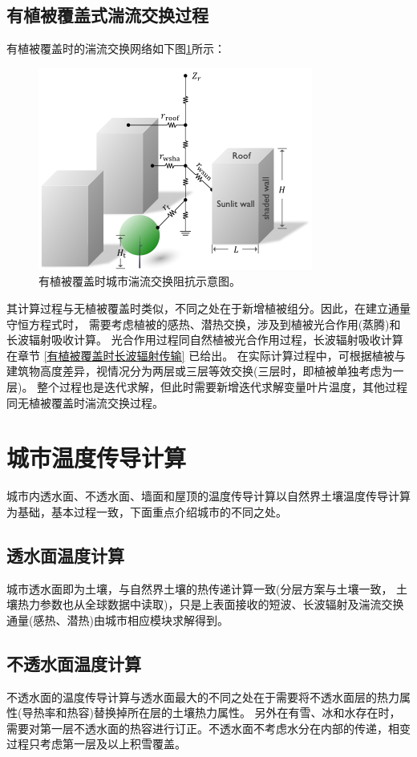 \subsection{有植被覆盖式湍流交换过程}
有植被覆盖时的湍流交换网络如下图\ref{fig:有植被覆盖时城市湍流交换阻抗示意图}所示：
{
\begin{figure}[]
\centering
\includegraphics{Figures/城市模式/有植被覆盖时城市湍流交换阻抗示意图.png}
\caption{有植被覆盖时城市湍流交换阻抗示意图。}
\label{fig:有植被覆盖时城市湍流交换阻抗示意图}
\end{figure}
}
其计算过程与无植被覆盖时类似，不同之处在于新增植被组分。因此，在建立通量守恒方程式时，
需要考虑植被的感热、潜热交换，涉及到植被光合作用(蒸腾)和长波辐射吸收计算。
光合作用过程同自然植被光合作用过程，长波辐射吸收计算在章节 \ref{有植被覆盖时长波辐射传输} 已给出。
在实际计算过程中，可根据植被与建筑物高度差异，视情况分为两层或三层等效交换(三层时，即植被单独考虑为一层)。
整个过程也是迭代求解，但此时需要新增迭代求解变量叶片温度，其他过程同无植被覆盖时湍流交换过程。
\section{城市温度传导计算}
城市内透水面、不透水面、墙面和屋顶的温度传导计算以自然界土壤温度传导计算为基础，基本过程一致，下面重点介绍城市的不同之处。
\subsection{透水面温度计算}
城市透水面即为土壤，与自然界土壤的热传递计算一致(分层方案与土壤一致，
土壤热力参数也从全球数据中读取)，只是上表面接收的短波、长波辐射及湍流交换通量(感热、潜热)由城市相应模块求解得到。
\subsection{不透水面温度计算}
不透水面的温度传导计算与透水面最大的不同之处在于需要将不透水面层的热力属性(导热率和热容)替换掉所在层的土壤热力属性。
另外在有雪、冰和水存在时，需要对第一层不透水面的热容进行订正。不透水面不考虑水分在内部的传递，相变过程只考虑第一层及以上积雪覆盖。
